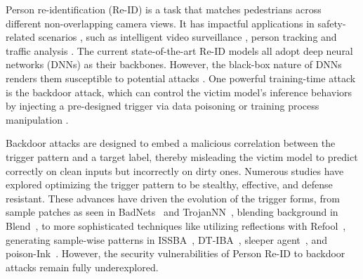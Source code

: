 \documentclass[sigconf,authordraft]{acmart}
\begin{document}
Person re-identification (Re-ID) is a task that matches pedestrians across different non-overlapping camera views. It has impactful applications in safety-related scenarios \cite{wei2018person,ye2021deep}, such as intelligent video surveillance \cite{chen2018real}, person tracking \cite{ristani2018features,insafutdinov2017arttrack} and traffic analysis \cite{wang2017orientation,zheng2020vehiclenet}. The current state-of-the-art Re-ID models all adopt deep neural networks (DNNs) \cite{simonyan2014very,he2016deep} as their backbones. However, the black-box nature of DNNs renders them susceptible to potential attacks \cite{carlini2017towards,Gu2017BadNetsIV,papernot2016limitations,xie2017adversarial}. One powerful training-time attack is the backdoor attack, which can control the victim model's inference behaviors by injecting a pre-designed trigger via data poisoning \cite{Gu2017BadNetsIV,chen2017targeted} or training process manipulation \cite{nguyen2020input,yao2019latent}.


Backdoor attacks are designed to embed a malicious correlation between the trigger pattern and a target label, thereby misleading the victim model to predict correctly on clean inputs but incorrectly on dirty ones. Numerous studies have explored optimizing the trigger pattern to be stealthy, effective, and defense resistant. These advances have driven the evolution of the trigger forms, from sample patches as seen in  BadNets~\cite{Gu2017BadNetsIV} and TrojanNN~\cite{liu2018trojaning}, blending background in Blend~\cite{chen2017targeted}, to more sophisticated techniques like utilizing reflections with Refool~\cite{liu2020reflection}, generating sample-wise patterns in ISSBA~\cite{li2021invisible}, DT-IBA~\cite{sun2022invisible}, sleeper agent~\cite{souri2022sleeper}, and poison-Ink~\cite{zhang2022poison}. However, the security vulnerabilities of Person Re-ID to backdoor attacks remain fully underexplored.
\end{document}
